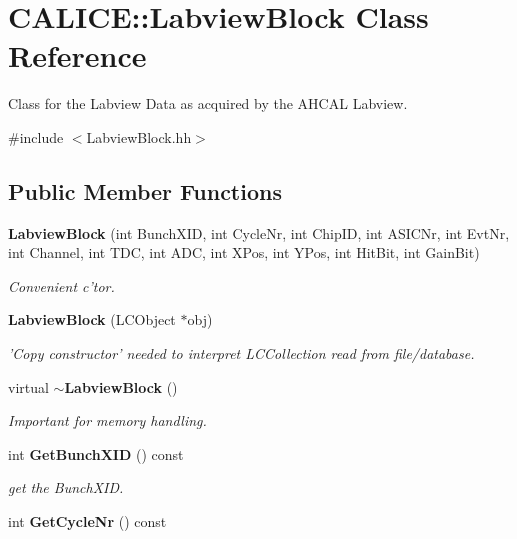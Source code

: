 \section{CALICE::LabviewBlock Class Reference}
\label{classCALICE_1_1LabviewBlock}


Class for the Labview Data as acquired by the AHCAL Labview.  


{\ttfamily \#include $<$LabviewBlock.hh$>$}\subsection*{Public Member Functions}
\begin{DoxyCompactItemize}
\item 
{\bf LabviewBlock} (int BunchXID, int CycleNr, int ChipID, int ASICNr, int EvtNr, int Channel, int TDC, int ADC, int XPos, int YPos, int HitBit, int GainBit)\label{classCALICE_1_1LabviewBlock_acadd794d318b2fc9132a20547107c499}

\begin{DoxyCompactList}\small\item\em Convenient c'tor. \item\end{DoxyCompactList}\item 
{\bf LabviewBlock} (LCObject $\ast$obj)\label{classCALICE_1_1LabviewBlock_ae8ff897ba24df56660d05a043768cb15}

\begin{DoxyCompactList}\small\item\em 'Copy constructor' needed to interpret LCCollection read from file/database. \item\end{DoxyCompactList}\item 
virtual {\bf $\sim$LabviewBlock} ()\label{classCALICE_1_1LabviewBlock_af2c2454dec16e14d52fd44545e06f3a9}

\begin{DoxyCompactList}\small\item\em Important for memory handling. \item\end{DoxyCompactList}\item 
int {\bf GetBunchXID} () const \label{classCALICE_1_1LabviewBlock_a94583fba9cc6196c89728b850e5f13b5}

\begin{DoxyCompactList}\small\item\em get the BunchXID. \item\end{DoxyCompactList}\item 
int {\bf GetCycleNr} () const \label{classCALICE_1_1LabviewBlock_ae8c915a57a7144c79521a2bd2562e8de}


\end{DoxyCompactItemize}
